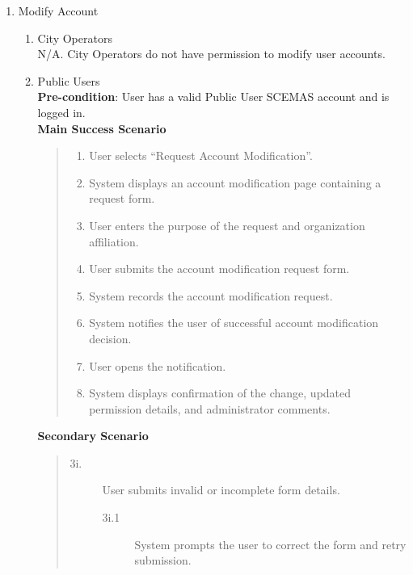 \documentclass[]{article}
\begin{document}
\begin{enumerate}[{\bf BE8.}]
	\item Modify Account
		\begin{enumerate}[{\bf VP1.}]
			\item City Operators \\
				    N/A. City Operators do not have permission to modify user accounts.

			\item Public Users \\
                \textbf{Pre-condition}: User has a valid Public User SCEMAS account and is logged in. \\
                \textbf{Main Success Scenario}
                \begin{quote}
                    \begin{enumerate}[1.]
                        \item User selects ``Request Account Modification''.
                        \item System displays an account modification page containing a request form.
                        \item User enters the purpose of the request and organization affiliation.
                        \item User submits the account modification request form.
                        \item System records the account modification request.
                        \item System notifies the user of successful account modification decision.
                        \item User opens the notification.
                        \item System displays confirmation of the change, updated permission details, and administrator comments.
                    \end{enumerate}
                \end{quote}
                \textbf{Secondary Scenario}
                \begin{quote}
                    \begin{description}
                        \item[\textmd{3i.}] User submits invalid or incomplete form details.
                        \begin{description}
                            \item[\textmd{3i.1}] System prompts the user to correct the form and retry submission.

\end{description}
\end{description}
\end{quote}
\end{enumerate}
\end{enumerate}
\end{document}

